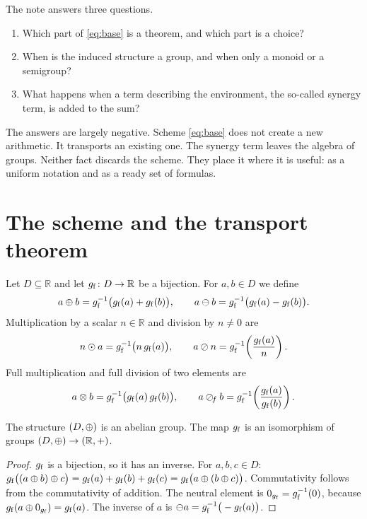 \documentclass[11pt,a4paper]{article}
\begin{document}
The note answers three questions.
\begin{enumerate}[label=(\roman*),leftmargin=2.2em]
  \item Which part of \eqref{eq:base} is a theorem, and which part is a choice?
  \item When is the induced structure a group, and when only a monoid or a
        semigroup?
  \item What happens when a term describing the environment, the so-called
        synergy term, is added to the sum?
\end{enumerate}

The answers are largely negative. Scheme \eqref{eq:base} does not create a new
arithmetic. It transports an existing one. The synergy term leaves the algebra
of groups. Neither fact discards the scheme. They place it where it is useful:
as a uniform notation and as a ready set of formulas.

\section{The scheme and the transport theorem}

\begin{definition}
\label{def:arith}
Let $D\subseteq\mathbb{R}$ and let $g_{\mathrm{f}}\colon D\to\mathbb{R}$ be a bijection.
For $a,b\in D$ we define
\[
a\mathbin{\oplus} b=g_{\mathrm{f}}^{-1}\big(g_{\mathrm{f}}(a)+g_{\mathrm{f}}(b)\big),\qquad
a\mathbin{\ominus} b=g_{\mathrm{f}}^{-1}\big(g_{\mathrm{f}}(a)-g_{\mathrm{f}}(b)\big).
\]
Multiplication by a scalar $n\in\mathbb{R}$ and division by $n\neq0$ are
\[
n\mathbin{\odot} a=g_{\mathrm{f}}^{-1}\big(n\,g_{\mathrm{f}}(a)\big),\qquad
a\mathbin{\oslash} n=g_{\mathrm{f}}^{-1}\!\left(\frac{g_{\mathrm{f}}(a)}{n}\right).
\]
Full multiplication and full division of two elements are
\[
a\mathbin{\otimes} b=g_{\mathrm{f}}^{-1}\big(g_{\mathrm{f}}(a)\,g_{\mathrm{f}}(b)\big),\qquad
a\mathbin{\oslash}_{\!f} b=g_{\mathrm{f}}^{-1}\!\left(\frac{g_{\mathrm{f}}(a)}{g_{\mathrm{f}}(b)}\right).
\]
\end{definition}

\begin{theorem}
\label{thm:transport}
The structure $(D,\mathbin{\oplus})$ is an abelian group. The map $g_{\mathrm{f}}$ is an isomorphism
of groups $(D,\mathbin{\oplus})\to(\mathbb{R},+)$.
\end{theorem}

\begin{proof}
$g_{\mathrm{f}}$ is a bijection, so it has an inverse. For $a,b,c\in D$:
$g_{\mathrm{f}}\big((a\mathbin{\oplus} b)\mathbin{\oplus} c\big)=g_{\mathrm{f}}(a)+g_{\mathrm{f}}(b)+g_{\mathrm{f}}(c)
=g_{\mathrm{f}}\big(a\mathbin{\oplus}(b\mathbin{\oplus} c)\big)$. Commutativity follows from the commutativity of
addition. The neutral element is $0_{g_{\mathrm{f}}}=g_{\mathrm{f}}^{-1}(0)$, because
$g_{\mathrm{f}}(a\mathbin{\oplus} 0_{g_{\mathrm{f}}})=g_{\mathrm{f}}(a)$. The inverse of $a$ is
$\mathbin{\ominus} a=g_{\mathrm{f}}^{-1}\big(-g_{\mathrm{f}}(a)\big)$.
\end{proof}
\end{document}

